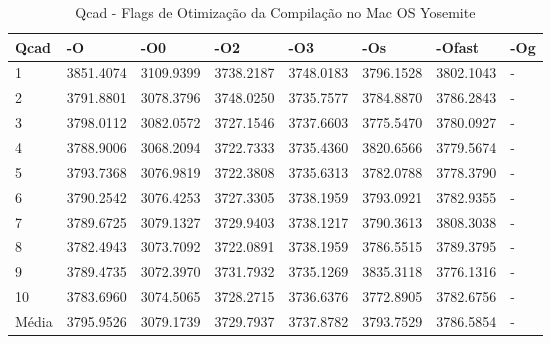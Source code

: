 \begin{table}[!ht]
\centering
\tiny
\caption{Qcad - Flags de Otimização da Compilação no Mac OS Yosemite}
\label{tab:otimizacao_compilacao:mac:qcad}
\begin{tabular}{llllllll}
\textbf{Qcad}         & \textbf{-O}  & \textbf{-O0}   & \textbf{-O2} & \textbf{-O3} & \textbf{-Os} & \textbf{-Ofast} & \textbf{-Og} \\ \toprule
1                     & 3851.4074    &   3109.9399    &   3738.2187  &   3748.0183  &   3796.1528  &   3802.1043     &  -           \\ 
2                     & 3791.8801    &   3078.3796    &   3748.0250  &   3735.7577  &   3784.8870  &   3786.2843     &  -           \\ 
3                     & 3798.0112    &   3082.0572    &   3727.1546  &   3737.6603  &   3775.5470  &   3780.0927     &  -           \\ 
4                     & 3788.9006    &   3068.2094    &   3722.7333  &   3735.4360  &   3820.6566  &   3779.5674     &  -           \\ 
5                     & 3793.7368    &   3076.9819    &   3722.3808  &   3735.6313  &   3782.0788  &   3778.3790     &  -           \\ 
6                     & 3790.2542    &   3076.4253    &   3727.3305  &   3738.1959  &   3793.0921  &   3782.9355     &  -           \\ 
7                     & 3789.6725    &   3079.1327    &   3729.9403  &   3738.1217  &   3790.3613  &   3808.3038     &  -           \\ 
8                     & 3782.4943    &   3073.7092    &   3722.0891  &   3738.1959  &   3786.5515  &   3789.3795     &  -           \\ 
9                     & 3789.4735    &   3072.3970    &   3731.7932  &   3735.1269  &   3835.3118  &   3776.1316     &  -           \\ 
10                    & 3783.6960    &   3074.5065    &   3728.2715  &   3736.6376  &   3772.8905  &   3782.6756     &  -           \\ \bottomrule
Média                 & 3795.9526    &   3079.1739    &   3729.7937  &   3737.8782  &   3793.7529  &   3786.5854     &  -           \\ 
\end{tabular}
\end{table}


